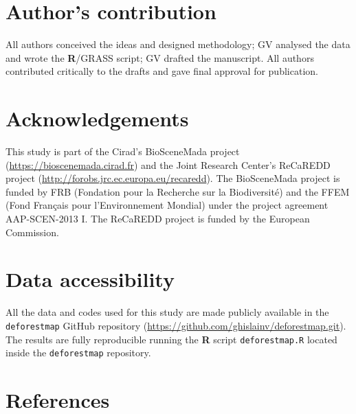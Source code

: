 \documentclass[a4paper, 12pt, leqno]{article} %
\newcommand{\R}{\textnormal{\sffamily\bfseries R}}
\begin{document}
\newpage

\section{Author's contribution}
\label{authors-contribution}

All authors conceived the ideas and designed methodology; GV analysed
the data and wrote the {\R}/GRASS script; GV drafted the manuscript. All
authors contributed critically to the drafts and gave final approval for
publication.

\section{Acknowledgements}
\label{acknowledgements}

This study is part of the Cirad's BioSceneMada project
(\url{https://bioscenemada.cirad.fr}) and the Joint Research Center's
ReCaREDD project (\url{http://forobs.jrc.ec.europa.eu/recaredd}). The
BioSceneMada project is funded by FRB (Fondation pour la Recherche sur
la Biodiversité) and the FFEM (Fond Français pour l'Environnement
Mondial) under the project agreement AAP-SCEN-2013 I. The ReCaREDD
project is funded by the European Commission.

\section{Data accessibility}
\label{data-accessibility}

All the data and codes used for this study are made publicly available
in the \texttt{deforestmap} GitHub repository
(\url{https://github.com/ghislainv/deforestmap.git}). The results are
fully reproducible running the {\R} script \texttt{deforestmap.R}
located inside the \texttt{deforestmap} repository.

\newpage
\singlespacing


\section{References}
\end{document}
